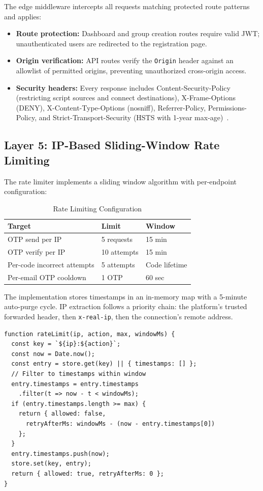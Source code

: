 \documentclass[11pt,a4paper]{article}
\theoremstyle{plain}
\theoremstyle{definition}
\begin{document}
The edge middleware intercepts all requests matching protected route patterns and applies:
\begin{itemize}[noitemsep,topsep=4pt]
    \item \textbf{Route protection:} Dashboard and group creation routes require valid JWT; unauthenticated users are redirected to the registration page.
    \item \textbf{Origin verification:} API routes verify the \texttt{Origin} header against an allowlist of permitted origins, preventing unauthorized cross-origin access.
    \item \textbf{Security headers:} Every response includes Content-Security-Policy (restricting script sources and connect destinations), X-Frame-Options (DENY), X-Content-Type-Options (nosniff), Referrer-Policy, Permissions-Policy, and Strict-Transport-Security (HSTS with 1-year max-age)~\cite{owasp2021}.
\end{itemize}

\subsection{Layer 5: IP-Based Sliding-Window Rate Limiting}

The rate limiter implements a sliding window algorithm with per-endpoint configuration:

\begin{table}[htbp]
\centering
\caption{Rate Limiting Configuration}
\label{tab:ratelimit}
\small
\renewcommand{\arraystretch}{1.15}
\begin{tabular}{@{}lll@{}}
\toprule
\textbf{Target} & \textbf{Limit} & \textbf{Window} \\
\midrule
OTP send per IP & 5 requests & 15 min \\
OTP verify per IP & 10 attempts & 15 min \\
Per-code incorrect attempts & 5 attempts & Code lifetime \\
Per-email OTP cooldown & 1 OTP & 60 sec \\
\bottomrule
\end{tabular}
\end{table}

The implementation stores timestamps in an in-memory map with a 5-minute auto-purge cycle. IP extraction follows a priority chain: the platform's trusted forwarded header, then \texttt{x-real-ip}, then the connection's remote address.

\begin{lstlisting}[language={}, caption={Sliding-window rate limiter}, label={lst:ratelimit}]
function rateLimit(ip, action, max, windowMs) {
  const key = `${ip}:${action}`;
  const now = Date.now();
  const entry = store.get(key) || { timestamps: [] };
  // Filter to timestamps within window
  entry.timestamps = entry.timestamps
    .filter(t => now - t < windowMs);
  if (entry.timestamps.length >= max) {
    return { allowed: false,
      retryAfterMs: windowMs - (now - entry.timestamps[0])
    };
  }
  entry.timestamps.push(now);
  store.set(key, entry);
  return { allowed: true, retryAfterMs: 0 };
}
\end{lstlisting}
\end{document}
